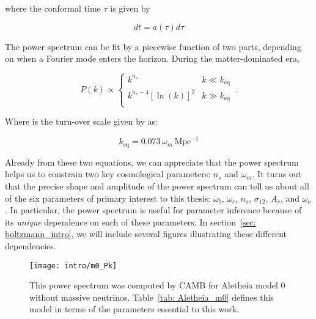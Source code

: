 where the conformal time $\tau$ is given by

\begin{equation}
dt = a(\tau) d \tau
\end{equation}

The power spectrum can be fit by a piecewise function of 
two parts, depending on when a Fourier mode enters the horizon.
During the matter-dominated era, 

\begin{equation}
\label{eq: n_s}
P(k) \propto 
\begin{cases}
      k^{n_s} & k \ll k_\text{eq} \\
      k^{n_s - 4} [\ln (k)]^2 & k \gg k_\text{eq} \\ 
    \end{cases}\,.
\end{equation}

Where is the turn-over scale given by \citet{FECS} as:

\begin{equation}
\label{eq: turnover}
k_\text{eq} = 0.073 \, \omega_m \, \mathrm{Mpc}^{-1}
\end{equation}


Already from these two equations, we can
appreciate that the power spectrum helps us to constrain two key cosmological
parameters: $n_s$ and $\omega_m$. It turns out that the precise shape and
amplitude of the power spectrum can tell us about all of the six
parameters of primary interest to this thesis:
$\omega_b$, $\omega_c$, $n_s$, $\sigma_{12}$, $A_s$, and $\omega_\nu$. 
In particular, the power spectrum is useful for parameter inference because of
its \textit{unique} dependence on each of these parameters. In 
section~\ref{sec: boltzmann_intro}, we will include several figures 
illustrating these different dependencies.


\begin{figure}[ht!]
  \centering
  \texttt{[image: intro/m0\_Pk]}
  \caption[Aletheia Model 0 Power Spectrum]{This power spectrum was
  computed by CAMB for Aletheia model 0 without massive neutrinos.
  Table~\ref{tab: Aletheia_m0} defines this model in terms
  of the parameters essential to this work.}
  \label{fig: first_power_spectrum}
\end{figure}

